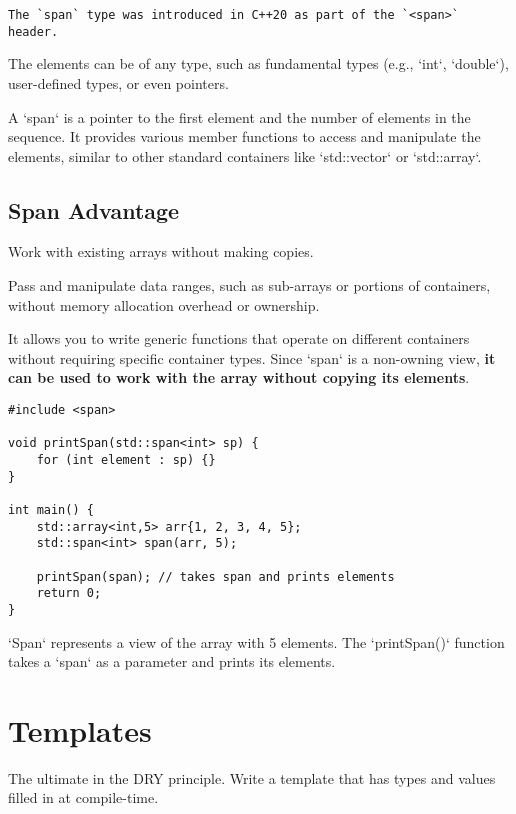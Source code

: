 \begin{verbatim}
The `span` type was introduced in C++20 as part of the `<span>` header. 
\end{verbatim}

The elements can be of any type, such as fundamental types (e.g., `int`, `double`), user-defined types,
or even pointers.

A `span` is a pointer to the first element and the number of elements in the sequence.
It provides various member functions to access and manipulate the elements,
similar to other standard containers like `std::vector` or `std::array`.

\subsection{Span Advantage}

Work with existing arrays without making copies.

Pass and manipulate data ranges, such as sub-arrays or portions of containers,
without memory allocation overhead or ownership.

It allows you to write generic functions that operate on different containers
without requiring specific container types.
Since `span` is a non-owning view, \textbf{it can be used to work with the array without copying its elements}.

\begin{verbatim}
#include <span>

void printSpan(std::span<int> sp) {
    for (int element : sp) {}
}

int main() {
    std::array<int,5> arr{1, 2, 3, 4, 5};
    std::span<int> span(arr, 5);

    printSpan(span); // takes span and prints elements
    return 0;
}
\end{verbatim}

`Span` represents a view of the array with 5 elements. 
The `printSpan()` function takes a `span` as a parameter and prints its elements.

\section{Templates}

The ultimate in the DRY principle. Write a template that has types and values filled in at compile-time.

